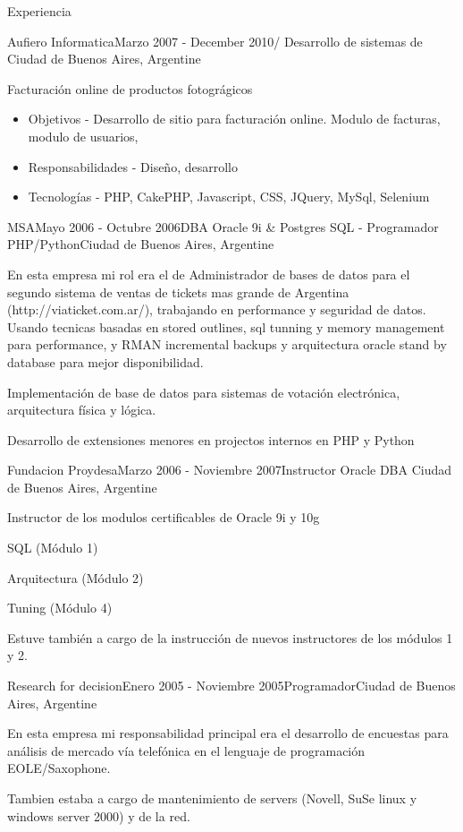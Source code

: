 \documentclass{resume} %
\begin{document}
\begin{rSection}{Experiencia}
\begin{rSubsection}{Aufiero Informatica}{Marzo 2007 - December 2010/ }{Desarrollo de sistemas de  }{Ciudad de Buenos Aires, Argentine}
\item Facturaci\'on online de productos fotogr\'agicos
	\begin{itemize}
		\item  Objetivos - Desarrollo de sitio para facturaci\'on online. Modulo de facturas, modulo de usuarios,
		\item Responsabilidades -  Dise\~no, desarrollo
		\item Tecnolog\'ias -  PHP, CakePHP, Javascript, CSS, JQuery, MySql, Selenium
	\end{itemize}


\end{rSubsection}


\begin{rSubsection}{MSA}{Mayo 2006 - Octubre 2006}{DBA Oracle 9i \& Postgres SQL - Programador PHP/Python}{Ciudad de Buenos Aires, Argentine}
\item En esta empresa mi rol era el de Administrador de bases de datos para el segundo sistema de ventas de tickets mas grande de Argentina (http://viaticket.com.ar/), trabajando en performance y seguridad de datos. Usando tecnicas basadas en stored outlines, sql tunning y memory management para performance, y RMAN incremental backups y arquitectura oracle stand by database para mejor disponibilidad.
\item Implementaci\'on de base de datos para sistemas de votaci\'on electr\'onica, arquitectura f\'isica y l\'ogica.
\item Desarrollo de extensiones menores en projectos internos en PHP y Python
\end{rSubsection}


\begin{rSubsection}{Fundacion Proydesa}{Marzo 2006 - Noviembre 2007}{Instructor Oracle DBA }{Ciudad de Buenos Aires, Argentine}
\item Instructor de los modulos certificables de Oracle 9i y 10g
\item SQL (M\'odulo 1)
\item Arquitectura (M\'odulo 2)
\item Tuning (M\'odulo 4)
\item Estuve tambi\'en a cargo de la instrucci\'on de nuevos instructores de los m\'odulos 1 y 2.
\end{rSubsection}

\begin{rSubsection}{Research for decision}{Enero 2005 - Noviembre 2005}{Programador}{Ciudad de Buenos Aires, Argentine}
\item En esta empresa mi responsabilidad principal era el desarrollo de encuestas para an\'alisis de mercado v\'ia telef\'onica en el lenguaje de programaci\'on EOLE/Saxophone.
\item Tambien estaba a cargo de mantenimiento de servers (Novell, SuSe linux y windows server 2000) y de la red.
\end{rSubsection}


\end{rSection}
\end{document}

